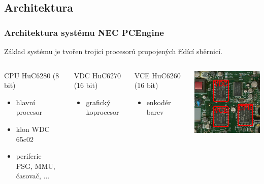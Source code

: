 \documentclass[10pt]{beamer}
\begin{document}
\subsection{Architektura}
\begin{frame}
\frametitle{Architektura systému NEC PCEngine}
Základ systému je tvořen trojicí procesorů propojených řídící sběrnicí.
\vglue 0.15cm
\begin{columns}
	\begin{block}{CPU HuC6280 (8 bit)}
	\begin{itemize}
		\item hlavní procesor
		\item klon WDC 65c02
		\item periferie \\
			PSG, MMU, časovač, ...
	\end{itemize}
	\end{block}
	\begin{block}{VDC HuC6270 (16 bit)}
	\begin{itemize}
		\item grafický koprocesor
	\end{itemize}
	\end{block}
	\begin{block}{VCE HuC6260 (16 bit)}
	\begin{itemize}
		\item enkodér barev
	\end{itemize}
	\end{block}
	\begin{center}
		\includegraphics[width=5cm]{fig/pce_board}
	\end{center}
\end{columns}
\end{frame}
\end{document}

